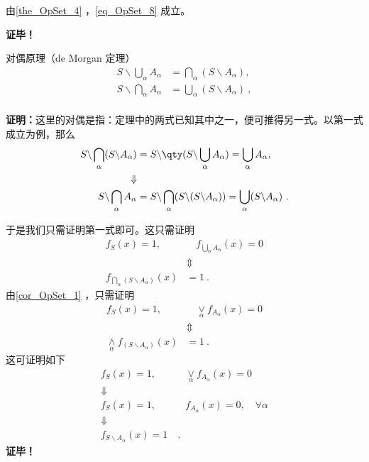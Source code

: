由\autoref{the_OpSet_4} ，\autoref{eq_OpSet_8} 成立。

\textbf{证毕！}
\begin{theorem}{对偶原理（de Morgan 定理）}
\begin{equation}
\begin{aligned}
S\backslash \bigcup_\alpha A_\alpha&=\bigcap_\alpha(S\backslash A_\alpha),\\
S\backslash \bigcap_\alpha A_\alpha&=\bigcup_\alpha(S \backslash A_\alpha)~,\\
\end{aligned}
\end{equation}
\end{theorem}
\textbf{证明：}这里的对偶是指：定理中的两式已知其中之一，便可推得另一式。以第一式成立为例，那么
\begin{equation}
\begin{aligned}
S\backslash \bigcap_\alpha (S\backslash A_\alpha)&=S\backslash \qty(S\backslash\bigcup_\alpha A_\alpha)=\bigcup_\alpha A_\alpha,\\
\Downarrow\\
S\backslash \bigcap_\alpha A_\alpha&=S\backslash \bigcap_\alpha (S\backslash (S\backslash A_\alpha))=\bigcup_\alpha (S\backslash A_\alpha)~.
\end{aligned}
\end{equation}

于是我们只需证明第一式即可。这只需证明
\begin{equation}
\begin{aligned}
f_S(x)=1,&\quad f_{\bigcup_\alpha A_\alpha}(x)=0\\
&\Updownarrow\\
f_{\bigcap_\alpha (S\backslash A_\alpha)}(x)&=1~.
\end{aligned}
\end{equation}
由\autoref{cor_OpSet_1} ，只需证明
\begin{equation}
\begin{aligned}
f_S(x)=1,&\quad \underset{\alpha}{\lor}f_{A_\alpha}(x)=0\\
&\Updownarrow\\
\underset{\alpha}{\land}f_{(S\backslash A_\alpha)}(x)&=1~.
\end{aligned}
\end{equation}
这可证明如下
\begin{equation}
\begin{aligned}
f_S(x)=1,&\quad \underset{\alpha}{\lor}f_{A_\alpha}(x)=0\\
\Downarrow\\
f_S(x)=1,&\quad f_{A_\alpha}(x)=0,\quad\forall \alpha\\
\Downarrow\\
f_{S\backslash A_\alpha}(x)=1&~.
\end{aligned}
\end{equation}
\textbf{证毕！}